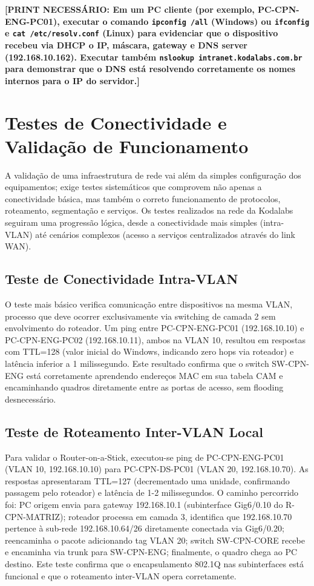 \documentclass[12pt,a4paper]{article}
\begin{document}
\textbf{[PRINT NECESSÁRIO: Em um PC cliente (por exemplo, PC-CPN-ENG-PC01), executar o comando \texttt{ipconfig /all} (Windows) ou \texttt{ifconfig} e \texttt{cat /etc/resolv.conf} (Linux) para evidenciar que o dispositivo recebeu via DHCP o IP, máscara, gateway e DNS server (192.168.10.162). Executar também \texttt{nslookup intranet.kodalabs.com.br} para demonstrar que o DNS está resolvendo corretamente os nomes internos para o IP do servidor.]}

\section{Testes de Conectividade e Validação de Funcionamento}

A validação de uma infraestrutura de rede vai além da simples configuração dos equipamentos; exige testes sistemáticos que comprovem não apenas a conectividade básica, mas também o correto funcionamento de protocolos, roteamento, segmentação e serviços. Os testes realizados na rede da Kodalabs seguiram uma progressão lógica, desde a conectividade mais simples (intra-VLAN) até cenários complexos (acesso a serviços centralizados através do link WAN).

\subsection{Teste de Conectividade Intra-VLAN}

O teste mais básico verifica comunicação entre dispositivos na mesma VLAN, processo que deve ocorrer exclusivamente via switching de camada 2 sem envolvimento do roteador. Um ping entre PC-CPN-ENG-PC01 (192.168.10.10) e PC-CPN-ENG-PC02 (192.168.10.11), ambos na VLAN 10, resultou em respostas com TTL=128 (valor inicial do Windows, indicando zero hops via roteador) e latência inferior a 1 milissegundo. Este resultado confirma que o switch SW-CPN-ENG está corretamente aprendendo endereços MAC em sua tabela CAM e encaminhando quadros diretamente entre as portas de acesso, sem flooding desnecessário.

\subsection{Teste de Roteamento Inter-VLAN Local}

Para validar o Router-on-a-Stick, executou-se ping de PC-CPN-ENG-PC01 (VLAN 10, 192.168.10.10) para PC-CPN-DS-PC01 (VLAN 20, 192.168.10.70). As respostas apresentaram TTL=127 (decrementado uma unidade, confirmando passagem pelo roteador) e latência de 1-2 milissegundos. O caminho percorrido foi: PC origem envia para gateway 192.168.10.1 (subinterface Gig6/0.10 do R-CPN-MATRIZ); roteador processa em camada 3, identifica que 192.168.10.70 pertence à sub-rede 192.168.10.64/26 diretamente conectada via Gig6/0.20; reencaminha o pacote adicionando tag VLAN 20; switch SW-CPN-CORE recebe e encaminha via trunk para SW-CPN-ENG; finalmente, o quadro chega ao PC destino. Este teste confirma que o encapsulamento 802.1Q nas subinterfaces está funcional e que o roteamento inter-VLAN opera corretamente.
\end{document}
